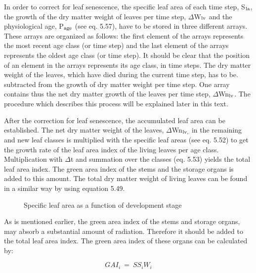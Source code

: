 In order to correct for leaf senescence, the specific leaf area of each time step, S$_{{\rm la}}$, the
growth of the dry matter weight of leaves per time step, $\Delta$W$_{{\rm lv}}$ and the physiological age,
P$_{{\rm age}}$ (see eq. 5.57), have to be stored in three different arrays. These arrays are organized
as follows: the first element of the arrays represents the most recent age class (or time
step) and the last element of the arrays represents the oldest age class (or time step). It
should be clear that the position of an element in the arrays represents its age class, in
time steps. The dry matter weight of the leaves, which have died during the current time
step, has to be. subtract\-ed from the growth of dry matter weight per time step. One array
contains thus the net dry matter growth of the leaves per time step, $\Delta$Wn$_{{\rm lv}}$. 
The procedure which describes this process will be explained later in this text. 

After the correction for leaf senescence, the accumulat\-ed leaf area can be established. The
net dry matter weight of the leaves, $\Delta$Wn$_{{\rm lv,}}$  in the remaining and new leaf classes is
multiplied with the specific leaf areas (see eq. 5.52) to get the growth rate of the leaf area
index of the living leaves per age class. Multiplication with $\Delta$t and summa\-tion over the
classes (eq. 5.53) yields the total leaf area index. The green area index of the stems and
the storage organs is added to this amount. The total dry matter weight of living leaves
can be found in a similar way by using equation 5.49.

\begin{figure}[htbp]
\caption{Spe\-cific leaf area as a function of develop\-ment stage}
\label{fig:SpecificLeafArea}
\begin{forcewidth}{10.05cm}
 \begin{center} \end{center}
\end{forcewidth}
\end{figure}

As is men\-tioned earlier, the green area index of the stems and storage or\-gans, may absorb
a substan\-tial amount of radiation. Therefore it should be added to the total leaf area
index. The green area index of these organs can be calculated by:

\begin{equation}
GAI  _{i} ~=~SS _{i} W _{i} 
\end{equation}

